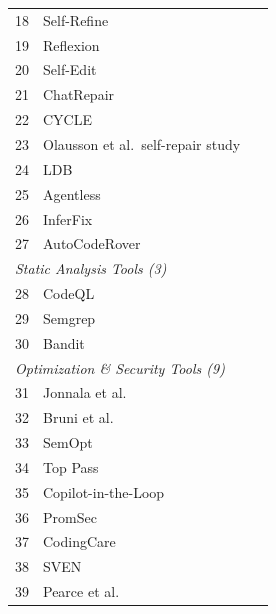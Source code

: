 \documentclass[10pt,a4paper]{article}
\begin{document}
\begin{table}[p]
\begin{tabular}{@{}clp{7.5cm}@{}}
18 & Self-Refine~\cite{madaan2023} & \cite{madaan2023} \\
19 & Reflexion~\cite{shinn2023} & \cite{shinn2023} \\
20 & Self-Edit~\cite{zhang2023selfedit} & \cite{zhang2023selfedit} \\
21 & ChatRepair~\cite{xia2024chatrepair} & \cite{xia2024chatrepair} \\
22 & CYCLE~\cite{ding2024cycle} & \cite{ding2024cycle} \\
23 & Olausson et al.\ self-repair study~\cite{olausson2024} & \cite{olausson2024} \\
24 & LDB~\cite{zhong2024ldb} & \cite{zhong2024ldb} \\
25 & Agentless~\cite{xia2025agentless} & \cite{xia2025agentless} \\
26 & InferFix~\cite{jin2023inferfix} & \cite{jin2023inferfix} \\
27 & AutoCodeRover~\cite{zhang2024autocoderover} & \cite{zhang2024autocoderover} \\
\midrule
\multicolumn{3}{l}{\textit{Static Analysis Tools (3)}} \\
\midrule
28 & CodeQL & \cite{bruni2025,ding2025codingcare} \\
29 & Semgrep & \cite{bruni2025,zhao2025semopt} \\
30 & Bandit & \cite{ding2025codingcare,nazzal2024promsec} \\
\midrule
\multicolumn{3}{l}{\textit{Optimization \& Security Tools (9)}} \\
\midrule
31 & Jonnala et al.~\cite{jonnala2025} & \cite{jonnala2025} \\
32 & Bruni et al.~\cite{bruni2025} & \cite{bruni2025} \\
33 & SemOpt~\cite{zhao2025semopt} & \cite{zhao2025semopt} \\
34 & Top Pass~\cite{lyu2025toppass} & \cite{lyu2025toppass} \\
35 & Copilot-in-the-Loop~\cite{zhang2024copilot} & \cite{zhang2024copilot} \\
36 & PromSec~\cite{nazzal2024promsec} & \cite{nazzal2024promsec} \\
37 & CodingCare~\cite{ding2025codingcare} & \cite{ding2025codingcare} \\
38 & SVEN~\cite{he2023sven} & \cite{he2023sven} \\
39 & Pearce et al.~\cite{pearce2022} & \cite{pearce2022} \\
\bottomrule
\end{tabular}
\end{table}
\end{document}
